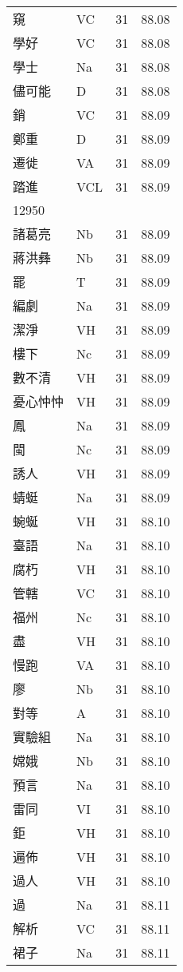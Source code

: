 \documentclass[twocolumn]{book}
\begin{document}
\begin{supertabular}{llrr}
窺 & VC & 31 &  88.08\\
學好 & VC & 31 &  88.08\\
學士 & Na & 31 &  88.08\\
儘可能 & D & 31 &  88.08\\
銷 & VC & 31 &  88.09\\
鄭重 & D & 31 &  88.09\\
遷徙 & VA & 31 &  88.09\\
踏進 & VCL & 31 &  88.09\\
12950\\
諸葛亮 & Nb & 31 &  88.09\\
蔣洪彝 & Nb & 31 &  88.09\\
罷 & T & 31 &  88.09\\
編劇 & Na & 31 &  88.09\\
潔淨 & VH & 31 &  88.09\\
樓下 & Nc & 31 &  88.09\\
數不清 & VH & 31 &  88.09\\
憂心忡忡 & VH & 31 &  88.09\\
鳳 & Na & 31 &  88.09\\
閩 & Nc & 31 &  88.09\\
誘人 & VH & 31 &  88.09\\
蜻蜓 & Na & 31 &  88.09\\
蜿蜒 & VH & 31 &  88.10\\
臺語 & Na & 31 &  88.10\\
腐朽 & VH & 31 &  88.10\\
管轄 & VC & 31 &  88.10\\
福州 & Nc & 31 &  88.10\\
盡 & VH & 31 &  88.10\\
慢跑 & VA & 31 &  88.10\\
廖 & Nb & 31 &  88.10\\
對等 & A & 31 &  88.10\\
實驗組 & Na & 31 &  88.10\\
嫦娥 & Nb & 31 &  88.10\\
預言 & Na & 31 &  88.10\\
雷同 & VI & 31 &  88.10\\
鉅 & VH & 31 &  88.10\\
遍佈 & VH & 31 &  88.10\\
過人 & VH & 31 &  88.10\\
過 & Na & 31 &  88.11\\
解析 & VC & 31 &  88.11\\
裙子 & Na & 31 &  88.11\\

\end{supertabular}
\end{document}
